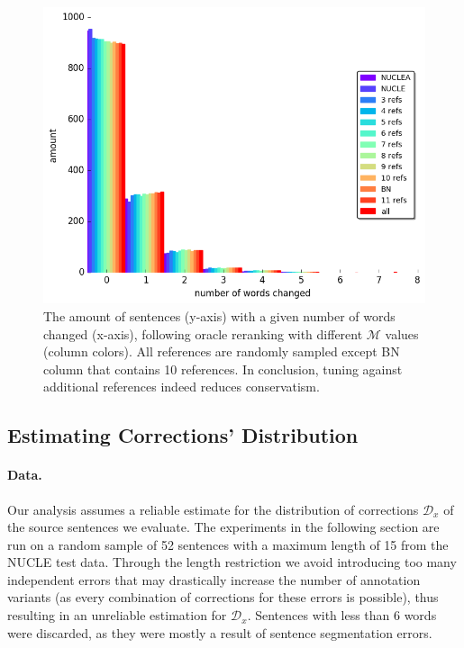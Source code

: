 \documentclass[letterpaper, 11pt]{article}
\begin{document}
\begin{figure}
	\vspace{-1em}
	\includegraphics[width=0.9\columnwidth]{words_differences_hist_reranking}
	\caption{The amount of sentences (y-axis) with a given number of words changed (x-axis), following oracle reranking with different $\mathcal{M}$ values (column colors). All references are randomly sampled except BN column that contains  10 references.
		In conclusion, tuning against additional references indeed reduces conservatism.
		\label{fig:reranking_word_change}
        }
	\vspace{-0.5cm}
\end{figure}
%
\subsection{Estimating Corrections' Distribution}\label{subsec:corrections_distribution}
%
\paragraph{Data.}
Our analysis assumes a reliable estimate for the distribution of corrections
$\mathcal{D}_x$ of the source sentences we evaluate.
The experiments in the following section are run on a random sample of 52 sentences with a maximum length of 15 from the NUCLE test data.
Through the length restriction we avoid introducing too many independent errors that may drastically increase the number of annotation 
variants (as every combination of corrections for these errors is possible), thus resulting in an unreliable estimation for $\mathcal{D}_x$.
Sentences with less than 6 words were discarded, as they were mostly a result of sentence segmentation errors.
\end{document}
